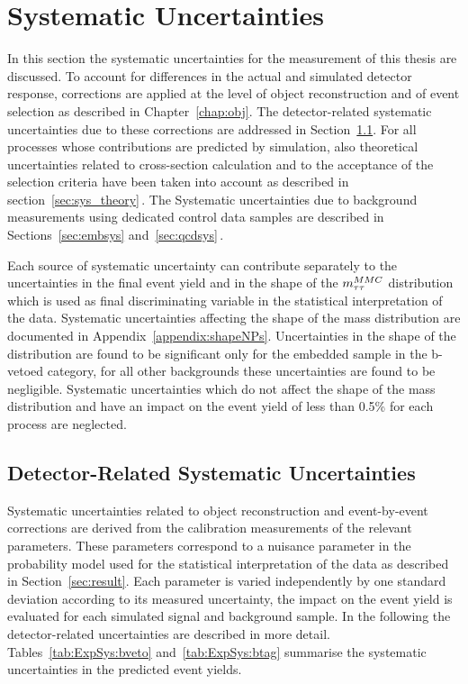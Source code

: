 \section{Systematic Uncertainties}
\label{sec:Systematics}

In this section the systematic uncertainties for the measurement of this thesis are discussed.
To account for differences in the actual and simulated detector response, corrections are applied at the level of
object reconstruction  and of event selection as described in Chapter~\ref{chap:obj}. 
The detector-related systematic uncertainties due to these corrections are addressed in Section~\ref{sec:sys:sys_det}. 
For all processes whose contributions are predicted by simulation, also theoretical
uncertainties related to cross-section calculation and to the acceptance of the selection criteria 
have been taken into account as  described in section~\ref{sec:sys_theory}$\,.$
The Systematic uncertainties due to  background measurements using dedicated control data samples
are described in Sections~\ref{sec:embsys} and~\ref{sec:qcdsys}$\,.$

Each source of systematic uncertainty can contribute separately to the uncertainties in the
final event yield and in the shape of the $m_{\tau\tau}^{MMC}$
distribution which is used as final discriminating variable in the statistical interpretation of the data. Systematic uncertainties
affecting the shape of the mass distribution are
documented in Appendix~\ref{appendix:shapeNPs}. Uncertainties in the shape of the \mmc  distribution 
are found to be significant only for the embedded sample in the b-vetoed category,
for all other  backgrounds these uncertainties are found to be negligible.
Systematic uncertainties which do not affect the
shape of the mass distribution and have an impact on the event yield of less than 0.5\% for each process are 
neglected.


\subsection{Detector-Related Systematic Uncertainties}
\label{sec:sys:sys_det}
Systematic uncertainties related to object reconstruction and event-by-event 
corrections are derived from the calibration measurements of the relevant parameters. These 
parameters correspond to a nuisance parameter in the probability model used for the  statistical interpretation
of the data as described in Section~\ref{sec:result}.
Each parameter is varied independently by one standard deviation  according to its measured
uncertainty, the impact on the event  yield is evaluated for each simulated signal and background sample.
In the following the detector-related uncertainties are  described in more detail.
Tables~\ref{tab:ExpSys:bveto} and~\ref{tab:ExpSys:btag}  summarise the systematic uncertainties in the 
predicted event yields. 


